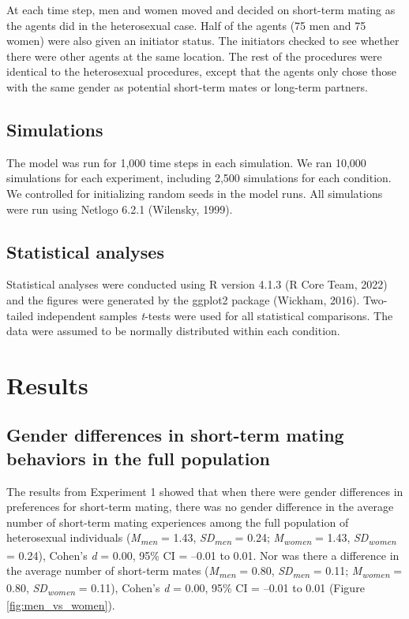 \documentclass[
  11pt,
]{article}
\begin{document}
At each time step, men and women moved and decided on short-term mating
as the agents did in the heterosexual case. Half of the agents (75 men
and 75 women) were also given an initiator status. The initiators
checked to see whether there were other agents at the same location. The
rest of the procedures were identical to the heterosexual procedures,
except that the agents only chose those with the same gender as
potential short-term mates or long-term partners.

\hypertarget{simulations}{%
\subsection{Simulations}\label{simulations}}

The model was run for 1,000 time steps in each simulation. We ran 10,000
simulations for each experiment, including 2,500 simulations for each
condition. We controlled for initializing random seeds in the model
runs. All simulations were run using Netlogo 6.2.1 (Wilensky, 1999).

\hypertarget{statistical-analyses}{%
\subsection{Statistical analyses}\label{statistical-analyses}}

Statistical analyses were conducted using R version 4.1.3 (R Core Team,
2022) and the figures were generated by the ggplot2 package (Wickham,
2016). Two-tailed independent samples \emph{t}-tests were used for all
statistical comparisons. The data were assumed to be normally
distributed within each condition.

\hypertarget{results}{%
\section{Results}\label{results}}

\hypertarget{gender-differences-in-short-term-mating-behaviors-in-the-full-population}{%
\subsection{Gender differences in short-term mating behaviors in the
full
population}\label{gender-differences-in-short-term-mating-behaviors-in-the-full-population}}

The results from Experiment 1 showed that when there were gender
differences in preferences for short-term mating, there was no gender
difference in the average number of short-term mating experiences among
the full population of heterosexual individuals
(\emph{M\textsubscript{men}} = 1.43, \emph{SD\textsubscript{men}} =
0.24; \emph{M\textsubscript{women}} = 1.43,
\emph{SD\textsubscript{women}} = 0.24), Cohen's \emph{d} = 0.00, 95\% CI
= --0.01 to 0.01. Nor was there a difference in the average number of
short-term mates (\emph{M\textsubscript{men}} = 0.80,
\emph{SD\textsubscript{men}} = 0.11; \emph{M\textsubscript{women}} =
0.80, \emph{SD\textsubscript{women}} = 0.11), Cohen's \emph{d} = 0.00,
95\% CI = --0.01 to 0.01 (Figure \ref{fig:men_vs_women}).
\end{document}

